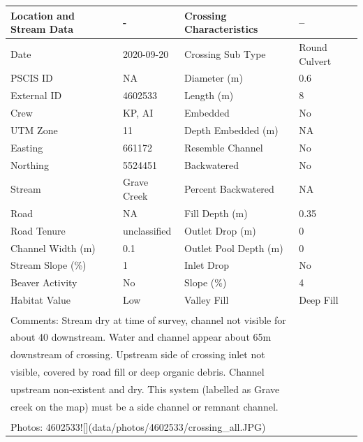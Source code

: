\documentclass[
]{book}
\begin{document}
\begin{tabular}{l|l|l|l}
\hline
Location and Stream Data & - & Crossing Characteristics & --\\
\hline
Date & 2020-09-20 & Crossing Sub Type & Round Culvert\\
\hline
PSCIS ID & NA & Diameter (m) & 0.6\\
\hline
External ID & 4602533 & Length (m) & 8\\
\hline
Crew & KP, AI & Embedded & No\\
\hline
UTM Zone & 11 & Depth Embedded (m) & NA\\
\hline
Easting & 661172 & Resemble Channel & No\\
\hline
Northing & 5524451 & Backwatered & No\\
\hline
Stream & Grave Creek & Percent Backwatered & NA\\
\hline
Road & NA & Fill Depth (m) & 0.35\\
\hline
Road Tenure & unclassified & Outlet Drop (m) & 0\\
\hline
Channel Width (m) & 0.1 & Outlet Pool Depth (m) & 0\\
\hline
Stream Slope (\%) & 1 & Inlet Drop & No\\
\hline
Beaver Activity & No & Slope (\%) & 4\\
\hline
Habitat Value & Low & Valley Fill & Deep Fill\\
\hline
\multicolumn{4}{l}{\textsuperscript{} Comments: Stream dry at time of survey, channel not visible for}\\
\multicolumn{4}{l}{about 40 downstream. Water and channel appear about 65m}\\
\multicolumn{4}{l}{downstream of crossing. Upstream side of crossing inlet not}\\
\multicolumn{4}{l}{visible, covered by road fill or deep organic debris. Channel}\\
\multicolumn{4}{l}{upstream non-existent and dry. This system (labelled as Grave}\\
\multicolumn{4}{l}{creek on the map) must be a side channel or remnant channel.}\\
\multicolumn{4}{l}{\textsuperscript{} Photos: 4602533![](data/photos/4602533/crossing\_all.JPG)}\\
\end{tabular}
\end{document}
